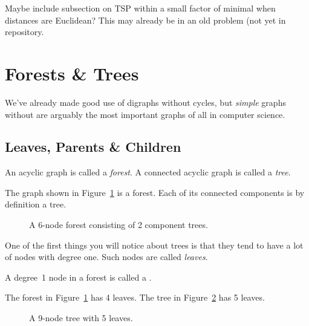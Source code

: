 \begin{editingnotes}
Maybe include subsection on TSP within a small factor of minimal when
distances are Euclidean?  This may already be in an old problem (not yet in repository.
\end{editingnotes}

\section{Forests \& Trees}\label{trees-sec}
We've already made good use of digraphs without cycles, but
\emph{simple} graphs without are arguably the most important graphs of
all in computer science.

\iffalse
As we have just seen, finding good cycles in a graph can be trickier than
you might first think.  But what if a graph has no cycles at all?  Sounds
pretty dull.
  But graphs without cycles, called \emph{acyclic graphs}, are
probably the most important graphs of all when it comes to computer
science.\fi

\subsection{Leaves, Parents \& Children}

\begin{definition}\label{def:tree}
An acyclic graph is called a \emph{forest}.  A connected acyclic graph
is called a \emph{tree}.
\end{definition}

The graph shown in Figure~\ref{fig:5I} is a forest.  Each of its
connected components is by definition a tree.

\begin{figure}


\caption{A 6-node forest consisting of 2 component trees.}
\label{fig:5I}
\end{figure}

One of the first things you will notice about trees is that they tend
to have a lot of nodes with degree one.  Such nodes are called
\emph{leaves}.

\begin{definition}
A degree~1 node in a forest is called a .
\end{definition}

The forest in Figure~\ref{fig:5I} has 4 leaves.  The tree in
Figure~\ref{fig:5H} has 5 leaves.
\begin{figure}


\caption{A 9-node tree with 5 leaves.}

\label{fig:5H}
\end{figure}

